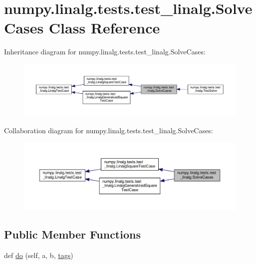 \hypertarget{classnumpy_1_1linalg_1_1tests_1_1test__linalg_1_1SolveCases}{}\section{numpy.\+linalg.\+tests.\+test\+\_\+linalg.\+Solve\+Cases Class Reference}
\label{classnumpy_1_1linalg_1_1tests_1_1test__linalg_1_1SolveCases}


Inheritance diagram for numpy.\+linalg.\+tests.\+test\+\_\+linalg.\+Solve\+Cases\+:
\nopagebreak
\begin{figure}[H]
\begin{center}
\leavevmode
\includegraphics[width=350pt]{classnumpy_1_1linalg_1_1tests_1_1test__linalg_1_1SolveCases__inherit__graph}
\end{center}
\end{figure}


Collaboration diagram for numpy.\+linalg.\+tests.\+test\+\_\+linalg.\+Solve\+Cases\+:
\nopagebreak
\begin{figure}[H]
\begin{center}
\leavevmode
\includegraphics[width=350pt]{classnumpy_1_1linalg_1_1tests_1_1test__linalg_1_1SolveCases__coll__graph}
\end{center}
\end{figure}
\subsection*{Public Member Functions}
\begin{DoxyCompactItemize}
\item 
def \hyperlink{classnumpy_1_1linalg_1_1tests_1_1test__linalg_1_1SolveCases_a2e1280444090bc4274ad6c6ec38c5ee4}{do} (self, a, b, \hyperlink{namespacenumpy_1_1linalg_1_1tests_1_1test__linalg_ac6a064918e74d701a7b5aac0ffefe1e7}{tags})
\end{DoxyCompactItemize}
